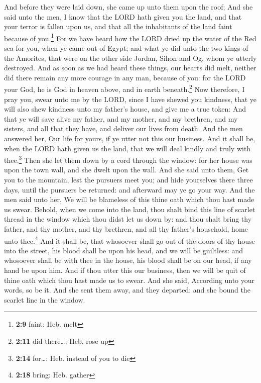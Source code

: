  And before they were laid down, she came up unto them
upon the roof;  And she said unto the men, I know that the
LORD hath given you the land, and that your terror is fallen upon us,
and that all the inhabitants of the land faint because of
you.\footnote{\textbf{2:9} faint: Heb. melt}  For we have
heard how the LORD dried up the water of the Red sea for you, when ye
came out of Egypt; and what ye did unto the two kings of the Amorites,
that were on the other side Jordan, Sihon and Og, whom ye utterly
destroyed.  And as soon as we had heard these things, our
hearts did melt, neither did there remain any more courage in any man,
because of you: for the LORD your God, he is God in heaven above, and in
earth beneath.\footnote{\textbf{2:11} did there\ldots: Heb. rose up}
 Now therefore, I pray you, swear unto me by the LORD,
since I have shewed you kindness, that ye will also shew kindness unto
my father's house, and give me a true token:  And that ye
will save alive my father, and my mother, and my brethren, and my
sisters, and all that they have, and deliver our lives from death.
 And the men answered her, Our life for yours, if ye
utter not this our business. And it shall be, when the LORD hath given
us the land, that we will deal kindly and truly with thee.\footnote{\textbf{2:14}
  for\ldots: Heb. instead of you to die}  Then she let
them down by a cord through the window: for her house was upon the town
wall, and she dwelt upon the wall.  And she said unto
them, Get you to the mountain, lest the pursuers meet you; and hide
yourselves there three days, until the pursuers be returned: and
afterward may ye go your way.  And the men said unto her,
We will be blameless of this thine oath which thou hast made us swear.
 Behold, when we come into the land, thou shalt bind this
line of scarlet thread in the window which thou didst let us down by:
and thou shalt bring thy father, and thy mother, and thy brethren, and
all thy father's household, home unto thee.\footnote{\textbf{2:18}
  bring: Heb. gather}  And it shall be, that whosoever
shall go out of the doors of thy house into the street, his blood shall
be upon his head, and we will be guiltless: and whosoever shall be with
thee in the house, his blood shall be on our head, if any hand be upon
him.  And if thou utter this our business, then we will
be quit of thine oath which thou hast made us to swear. 
And she said, According unto your words, so be it. And she sent them
away, and they departed: and she bound the scarlet line in the window.

